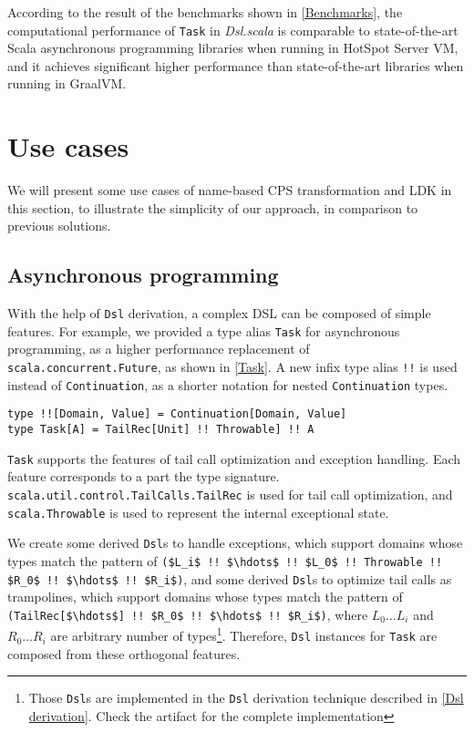 \begin{description}
  According to the result of the benchmarks shown in \cref{Benchmarks}, the computational performance of \lstinline{Task} in \textit{Dsl.scala} is comparable to state-of-the-art Scala asynchronous programming libraries when running in HotSpot Server VM, and it achieves significant higher performance than state-of-the-art libraries when running in GraalVM.
\end{description}

\section{Use cases}

We will present some use cases of name-based CPS transformation and LDK in this section, to illustrate the simplicity of our approach, in comparison to previous solutions.

\subsection{Asynchronous programming}\label{Asynchronous programming}

With the help of \lstinline{Dsl} derivation, a complex DSL can be composed of simple features. For example, we provided a type alias \lstinline{Task} for asynchronous programming, as a higher performance replacement of \lstinline{scala.concurrent.Future}, as shown in \cref{Task}. A new infix type alias \lstinline{!!} is used instead of \lstinline{Continuation}, as a shorter notation for nested \lstinline{Continuation} types.
\begin{lstlisting}[caption={The definition of asynchronous \lstinline{Task}},label={Task}]
type !![Domain, Value] = Continuation[Domain, Value]
type Task[A] = TailRec[Unit] !! Throwable] !! A
\end{lstlisting}

\lstinline{Task} supports the features of tail call optimization and exception handling. Each feature corresponds to a part the type signature. \lstinline{scala.util.control.TailCalls.TailRec} is used for tail call optimization, and \lstinline{scala.Throwable} is used to represent the internal exceptional state.

We create some derived \lstinline{Dsl}s to handle exceptions, which support domains whose types match the pattern of \lstinline[mathescape=true]{($L_i$ !! $\hdots$ !! $L_0$ !! Throwable !! $R_0$ !! $\hdots$ !! $R_i$)}, and some derived \lstinline{Dsl}s to optimize tail calls as trampolines, which support domains whose types match the pattern of \lstinline[mathescape=true]{(TailRec[$\hdots$] !! $R_0$ !! $\hdots$ !! $R_i$)}, where $L_0 \hdots L_i$ and $R_0 \hdots R_i$ are arbitrary number of types\footnote{Those \lstinline{Dsl}s are implemented in the \lstinline{Dsl} derivation technique described in \cref{Dsl derivation}. Check the artifact for the complete implementation}. Therefore, \lstinline{Dsl} instances for \lstinline{Task} are composed from these orthogonal features.

